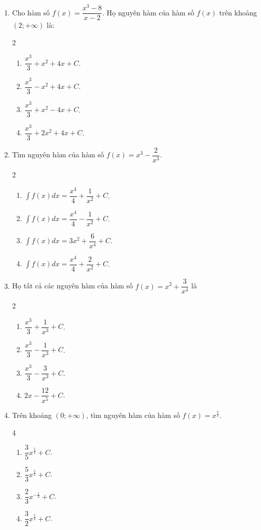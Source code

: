 \documentclass[12pt]{article}
\begin{document}
\begin{enumerate}[label=\textbf{Câu \arabic*.}]
		\item Cho hàm số $f(x) = \dfrac{x^3 - 8}{x - 2}$. Họ nguyên hàm của hàm số $f(x)$ trên khoảng $(2; +\infty)$ là:
		\begin{multicols}{2}
			\begin{enumerate}[label=\textbf{\Alph*.}]
				\item $\dfrac{x^3}{3} + x^2 + 4x + C$.
				\item $\dfrac{x^3}{3} - x^2 + 4x + C$.
				\item $\dfrac{x^3}{3} + x^2 - 4x + C$.
				\item $\dfrac{x^3}{3} + 2x^2 + 4x + C$.
			\end{enumerate}
		\end{multicols}
		
		\item Tìm nguyên hàm của hàm số $f(x) = x^3 - \dfrac{2}{x^3}$.
		\begin{multicols}{2}
			\begin{enumerate}[label=\textbf{\Alph*.}]
				\item $\displaystyle \int f(x)dx = \dfrac{x^4}{4} + \dfrac{1}{x^2} + C$.
				\item $\displaystyle \int f(x)dx = \dfrac{x^4}{4} - \dfrac{1}{x^2} + C$.
				\item $\displaystyle \int f(x)dx = 3x^2 + \dfrac{6}{x^4} + C$.
				\item $\displaystyle \int f(x)dx = \dfrac{x^4}{4} + \dfrac{2}{x^2} + C$.
			\end{enumerate}
		\end{multicols}
		
		\item Họ tất cả các nguyên hàm của hàm số $f(x) = x^2 + \dfrac{3}{x^4}$ là
		\begin{multicols}{2}
			\begin{enumerate}[label=\textbf{\Alph*.}]
				\item $\dfrac{x^3}{3} + \dfrac{1}{x^3} + C$.
				\item $\dfrac{x^3}{3} - \dfrac{1}{x^3} + C$.
				\item $\dfrac{x^3}{3} - \dfrac{3}{x^3} + C$.
				\item $2x - \dfrac{12}{x^5} + C$.
			\end{enumerate}
		\end{multicols}
		
		\item Trên khoảng $(0; +\infty)$, tìm nguyên hàm của hàm số $f(x) = x^{\frac{2}{3}}$.
		\begin{multicols}{4}
			\begin{enumerate}[label=\textbf{\Alph*.}]
				\item $\dfrac{3}{5}x^{\frac{5}{3}} + C$.
				\item $\dfrac{5}{3}x^{\frac{5}{3}} + C$.
				\item $\dfrac{2}{3}x^{-\frac{1}{3}} + C$.
				\item $\dfrac{3}{2}x^{\frac{5}{3}} + C$.
			\end{enumerate}
		\end{multicols}
		

\end{enumerate}
\end{document}
